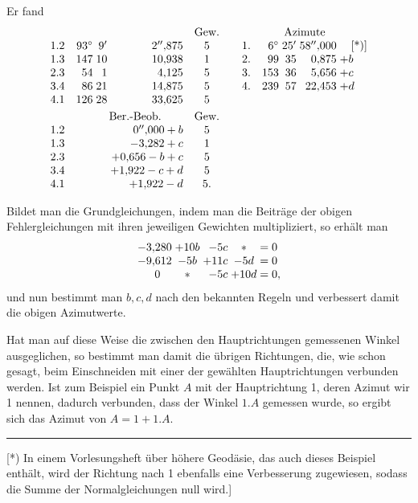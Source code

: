 Er fand
\[
\begin{array}{@{}r@{\quad}r@{\;}r@{\;}r@{\quad}c@{\qquad}l@{\quad}r@{\;}r@{\;}r@{\;}l@{}}
 \multicolumn{4}{c}{}&\text{Gew.}&
 \multicolumn{5}{c}{\text{Azimute}}\\
 1.2&93^\circ&9'&2''{,}875&5&1.&6^\circ&25'&58''{,}000&\quad\text{[*)]}\\
 1.3&147&10&10{,}938&1&2.&99&35&0{,}875&+b\\
 2.3&54&1&4{,}125&5&3.&153&36&5{,}656&+c\\
 3.4&86&21&14{,}875&5&4.&239&57&22{,}453&+d\\
 4.1&126&28&33{,}625&5&&&&&\\[3pt]
 &\multicolumn{3}{c}{\text{Ber.-Beob.}}&\text{Gew.}&&&&&\\
 1.2&&&0''{,}000+b&5&&&&&\\
 1.3&&&-3{,}282+c&1&&&&&\\
 2.3&&&+0{,}656-b+c&5&&&&&\\
 3.4&&&+1{,}922-c+d&5&&&&&\\
 4.1&&&+1{,}922-d&5.&&&&&
\end{array}
\]

Bildet man die Grundgleichungen, indem man die Beiträge der obigen Fehlergleichungen mit ihren jeweiligen Gewichten multipliziert, so erhält man
\[
\begin{array}{@{}r@{\;}c@{\;}r@{\;}c@{\;=\;}l@{}}
 -3{,}280&+10b&-5c&*&0\\
 -9{,}612&-5b&+11c&-5d&0\\
 \multicolumn{1}{c@{\;}}{0}&*&-5c&+10d&0,
\end{array}
\]
und nun bestimmt man \(b,c,d\) nach den bekannten Regeln und verbessert damit die obigen Azimutwerte.

Hat man auf diese Weise die zwischen den Hauptrichtungen gemessenen Winkel ausgeglichen, so bestimmt man damit die übrigen Richtungen, die, wie schon gesagt, beim Einschneiden mit einer der gewählten Hauptrichtungen verbunden werden. Ist zum Beispiel ein Punkt \(A\) mit der Hauptrichtung 1, deren Azimut wir 1 nennen, dadurch verbunden, dass der Winkel \(1.A\) gemessen wurde, so ergibt sich das Azimut von \(A=1+1.A\).

\par\smallskip\noindent\rule{4cm}{.4pt}\par
{\footnotesize\noindent\hspace*{\parindent}[*) In einem Vorlesungsheft über höhere Geodäsie, das auch dieses Beispiel enthält, wird der Richtung nach 1 ebenfalls eine Verbesserung zugewiesen, sodass die Summe der Normalgleichungen null wird.]\par}
\par\smallskip\noindent\makebox[.86\linewidth][r]{37\textsuperscript{*}}\par
\endgroup
